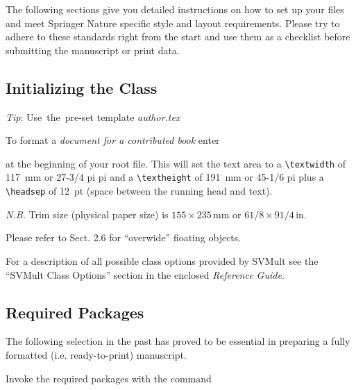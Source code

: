 \documentclass[graybox]{svmult}
\begin{document}
\begin{refguide}
\begin{sloppy}
The following sections give you detailed instructions on how to set up your files and meet Springer Nature specific style and layout requirements. Please try to adhere to these standards right from the start and use them as a checklist before submitting the manuscript or print data.

\subsection{Initializing the Class}

\hspace*{29pc}\hbox{{\it Tip}:}
\hspace*{29pc}\hbox{Use the pre-set}
\hspace*{29pc}\hbox{template}
\hspace*{29pc}\hbox{{\it author.tex}}

\vspace*{-4.5pc}

To format a {\it document for a contributed book} enter

\cprotect{}

at the beginning of your root file. This will set the text area to a \verb|\textwidth| of 117~mm or 27-3/4 pi pi and a \verb|\textheight| of 191~mm or 45-1/6 pi plus a \verb|\headsep| of 12~pt (space between the running head and text).

{\it N.B.} Trim size (physical paper size) is $155 \times 235$\,mm or $61/8 \times 91/4$\,in.

Please refer to Sect. 2.6 for ``overwide'' fioating objects.

For a description of all possible class options provided by {\sc SVMult} see the ``{\sc SVMult} Class Options'' section in the enclosed {\it Reference Guide}.

\subsection{Required Packages}

The following selection in the past has proved to be essential in preparing a fully formatted (i.e. ready-to-print) manuscript.

Invoke the required packages with the command

\cprotect\boxtext{\verb|\usepackage{}|}


\end{sloppy}
\end{refguide}
\end{document}
